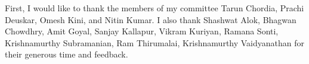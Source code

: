 First, I would like to thank the members of my committee Tarun Chordia, Prachi Deuskar, Omesh Kini, and Nitin Kumar. I also thank Shashwat Alok, Bhagwan Chowdhry, Amit Goyal, Sanjay Kallapur, Vikram Kuriyan, Ramana Sonti, Krishnamurthy Subramanian, Ram Thirumalai, Krishnamurthy Vaidyanathan for their generous time and feedback.